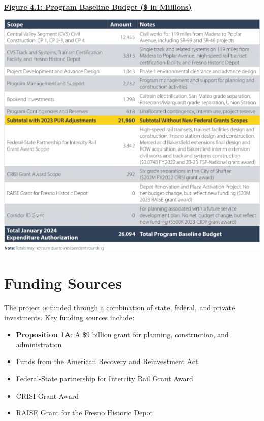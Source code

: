 \centering\textbf{\underline{Figure 4.1: Program Baseline Budget (\$ in Millions) \citep{ureport2025}}} \par
\noindent 
\vspace*{1em}
\includegraphics[width=\linewidth]{./attachments/budgeting}
\justifying

\section{Funding Sources}
\parindent20pt The project is funded through a combination of state, federal, and private investments. Key funding sources include: \begin{itemize}
	\item\textbf{Proposition 1A}: A \$9 billion grant for planning, construction, and administration \citep{proposition1A}
	\item Funds from the American Recovery and Reinvestment Act
	\item Federal-State partnership for Intercity Rail Grant Award
	\item CRISI Grant Award
	\item RAISE Grant for the Fresno Historic Depot
\end{itemize}

